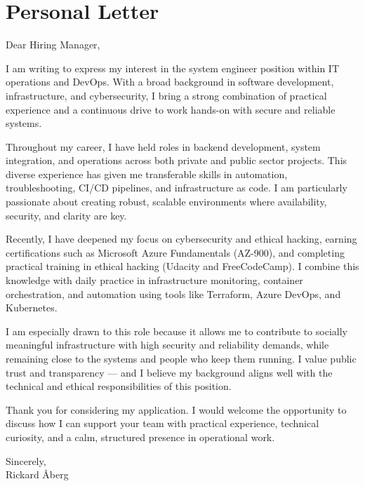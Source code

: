 \documentclass[a4paper,10pt]{article}
\begin{document}
\section*{Personal Letter}

Dear Hiring Manager,

I am writing to express my interest in the system engineer position within IT operations and DevOps. With a broad background in software development, infrastructure, and cybersecurity, I bring a strong combination of practical experience and a continuous drive to work hands-on with secure and reliable systems.

Throughout my career, I have held roles in backend development, system integration, and operations across both private and public sector projects. This diverse experience has given me transferable skills in automation, troubleshooting, CI/CD pipelines, and infrastructure as code. I am particularly passionate about creating robust, scalable environments where availability, security, and clarity are key.

Recently, I have deepened my focus on cybersecurity and ethical hacking, earning certifications such as Microsoft Azure Fundamentals (AZ-900), and completing practical training in ethical hacking (Udacity and FreeCodeCamp). I combine this knowledge with daily practice in infrastructure monitoring, container orchestration, and automation using tools like Terraform, Azure DevOps, and Kubernetes.

I am especially drawn to this role because it allows me to contribute to socially meaningful infrastructure with high security and reliability demands, while remaining close to the systems and people who keep them running. I value public trust and transparency — and I believe my background aligns well with the technical and ethical responsibilities of this position.

Thank you for considering my application. I would welcome the opportunity to discuss how I can support your team with practical experience, technical curiosity, and a calm, structured presence in operational work.

Sincerely,\\
Rickard Åberg
\end{document}
